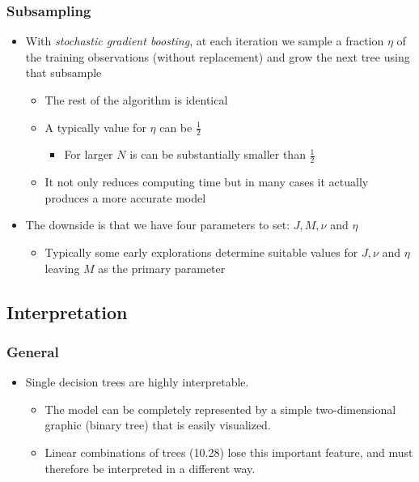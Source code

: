 \documentclass[11pt]{article}
\begin{document}
\subsubsection{Subsampling}
\label{sec:org3acb5db}
\begin{itemize}
\item With \emph{stochastic gradient boosting}, at each iteration we sample a fraction \(\eta\) of the training observations (without replacement) and grow the next tree using that subsample
\begin{itemize}
\item The rest of the algorithm is identical
\item A typically value for \(\eta\) can be \(\frac12\)
\begin{itemize}
\item For larger \(N\) is can be substantially smaller than \(\frac12\)
\end{itemize}
\item It not only reduces computing time but in many cases it actually produces a more accurate model
\end{itemize}

\item The downside is that we have four parameters to set: \(J,M, \nu\) and \(\eta\)
\begin{itemize}
\item Typically some early explorations determine suitable values for \(J, \nu\) and \(\eta\) leaving \(M\) as the primary parameter
\end{itemize}
\end{itemize}

\subsection{Interpretation}
\label{sec:org6b1b0ca}
\subsubsection{General}
\label{sec:org70c94b2}
\begin{itemize}
\item Single decision trees are highly interpretable.
\begin{itemize}
\item The model can be completely represented by a simple two-dimensional graphic (binary tree) that is easily visualized.
\item Linear combinations of trees (10.28) lose this important feature, and must therefore be interpreted in a different way.
\end{itemize}
\end{itemize}
\end{document}
